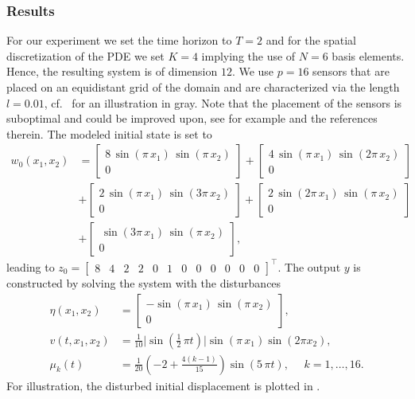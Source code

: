 \documentclass[11pt,reqno]{amsart}
\numberwithin{equation}{section}
\theoremstyle{plain}
\begin{document}
\subsubsection{Results}
%
For our experiment we set the time horizon to $T = 2$ and for the spatial discretization of the PDE we set $K=4$ implying the use of $N= 6$ basis elements. Hence, the resulting system is of dimension $12$. We use $p=16 $ sensors that are placed on an equidistant grid of the domain and are characterized via the length $l = 0.01$, cf.~ for an illustration in gray.  
Note that the placement of the sensors is suboptimal and could be improved upon, see for example \cite{WuJaEl16} and the references therein. 
The modeled initial state is set to 
%
\begin{equation*}
\begin{aligned}
    w_0(x_1,x_2) &= \begin{bmatrix} 8 \, \sin(\pi \, x_1) \, \sin(\pi \, x_2)\\0 \end{bmatrix}
	 + \begin{bmatrix} 4 \, \sin(\pi \, x_1) \, \sin(2 \pi \, x_2)\\0 \end{bmatrix}\\
	 &+ \begin{bmatrix} 2 \, \sin(\pi \, x_1) \, \sin(3 \pi \, x_2)\\0 \end{bmatrix}
	 + \begin{bmatrix} 2 \, \sin(2 \pi \, x_1) \, \sin(\pi \, x_2)\\0 \end{bmatrix}\\
	 &+ \begin{bmatrix} \, \sin(3 \pi \, x_1) \, \sin(\pi \, x_2)\\0 \end{bmatrix}
	 ,
\end{aligned}
\end{equation*}
%
leading to $z_0 = \begin{bmatrix} 8 & 4 & 2 & 2 & 0 & 1 & 0 & 0 & 0 & 0 & 0 & 0 \end{bmatrix}^\top$. 
The output $y$ is constructed by solving the system with the disturbances
%
\begin{equation*}
\begin{aligned}
	 \eta(x_1,x_2) &= \begin{bmatrix} - \sin(\pi \, x_1) \, \sin(\pi \, x_2)\\0 \end{bmatrix},\\
	 v(t,x_1,x_2) &= \tfrac{1}{10} \vert \sin(\tfrac{1}{2} \, \pi t) \vert \sin(\pi \, x_1) \sin(2 \pi x_2),\\
	 \mu_k(t) & = \frac{1}{20} \left(-2 + \frac{4(k-1)}{15} \right) \sin(5 \, \pi t),
	 ~~~~~~ k = 1,\dots,16.
\end{aligned}
\end{equation*}
%
For illustration, the disturbed initial displacement is plotted in .
\end{document}
